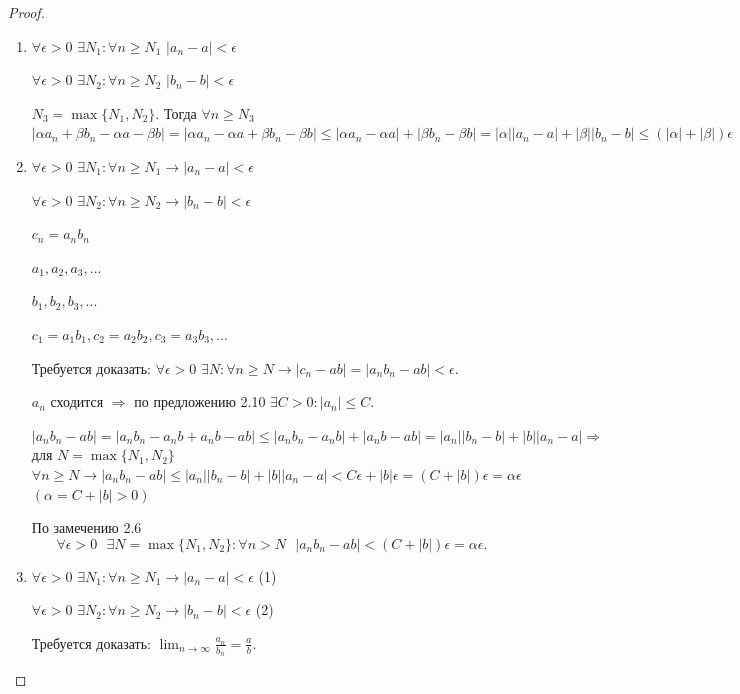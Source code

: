 	\begin{proof}
		\begin{enumerate}
			\item $\forall \epsilon > 0$ $\exists N_1: \forall n \geqslant N_1$ $|a_n - a| < \epsilon$
			
			$\forall \epsilon > 0$ $\exists N_2: \forall n \geqslant N_2$ $|b_n - b| < \epsilon$
			
			$N_3 = \max\{N_1, N_2\}.$ Тогда $\forall n \geqslant N_3$ $|\alpha a_n + \beta b_n - \alpha a - \beta b| = |\alpha a_n - \alpha a + \beta b_n - \beta b| \leqslant |\alpha a_n - \alpha a| + |\beta b_n - \beta b| = |\alpha| |a_n - a| + |\beta| |b_n - b| \leqslant (|\alpha| + |\beta|)\epsilon$
			\item $\forall \epsilon > 0$ $\exists N_1: \forall n \geqslant N_1 \rightarrow |a_n - a| < \epsilon$
			
			$\forall \epsilon > 0$ $\exists N_2: \forall n \geqslant N_2 \rightarrow |b_n - b| < \epsilon$
			
			$c_n = a_n b_n$
			
			$a_1, a_2, a_3, ...$
			
			$b_1, b_2, b_3, ...$
			
			$c_1 = a_1 b_1, c_2 = a_2 b_2, c_3 = a_3 b_3, ...$
			
			Требуется доказать: $\forall \epsilon > 0$ $\exists N: \forall n \geqslant N \rightarrow |c_n - ab| = |a_n b_n - ab| < \epsilon.$
			
			$a_n$ сходится $\Rightarrow$ по предложению 2.10 $\exists C > 0: |a_n| \leqslant C.$
			
			$|a_n b_n - ab| = |a_n b_n - a_n b + a_n b - ab| \leqslant |a_n b_n - a_n b| + |a_n b - ab| = |a_n| |b_n - b| + |b| |a_n - a| \Rightarrow$ для $N = \max\{N_1, N_2\}$ $\forall n \geqslant N \rightarrow |a_n b_n - ab| \leqslant |a_n| |b_n - b| + |b| |a_n - a| < C \epsilon + |b| \epsilon = (C + |b|) \epsilon = \alpha \epsilon$ $(\alpha = C + |b| > 0)$
			
			По замечению 2.6
			\[ \forall \epsilon > 0 \text{ } \exists N = \max\{N_1, N_2\}: \forall n > N \text{ } |a_n b_n - ab| < (C + |b|) \epsilon = \alpha \epsilon. \]
			\item $\forall \epsilon > 0$ $\exists N_1: \forall n \geqslant N_1 \rightarrow |a_n - a| < \epsilon$ (1)
			
			$\forall \epsilon > 0$ $\exists N_2: \forall n \geqslant N_2 \rightarrow |b_n - b| < \epsilon$ (2)
			
			Требуется доказать: $\lim_{n \to \infty} \frac{a_n}{b_n} = \frac{a}{b}$.
			

\end{enumerate}
\end{proof}
